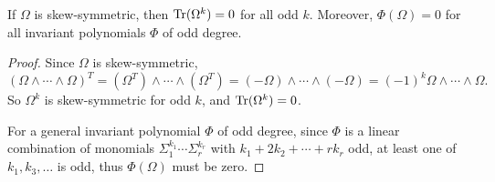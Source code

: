 \begin{proposition}
    If $\Omega$ is skew-symmetric, then ${\rm Tr}(\Omega^k) = 0$ for all odd $k$. 
    Moreover, $\Phi(\Omega) = 0$ for all invariant polynomials $\Phi$ of odd degree. 
\end{proposition}
\begin{proof}
    Since $\Omega$ is skew-symmetric, 
    \begin{equation*}
        (\Omega\wedge\cdots\wedge\Omega)^T = (\Omega^T)\wedge\cdots\wedge(\Omega^T) 
        = (-\Omega)\wedge\cdots\wedge(-\Omega) = (-1)^k\Omega\wedge\cdots\wedge\Omega.
    \end{equation*}
    So $\Omega^k$ is skew-symmetric for odd $k$, and ${\rm Tr}(\Omega^k) = 0$. 

    For a general invariant polynomial $\Phi$ of odd degree, 
    since $\Phi$ is a linear combination of monomials $\Sigma_1^{k_1}\cdots\Sigma_r^{k_r}$ with $k_1 + 2k_2 + \cdots + rk_r$ odd,
    at least one of $k_1,k_3,\dots$ is odd, thus $\Phi(\Omega)$ must be zero.
\end{proof}

